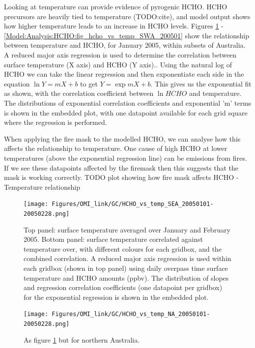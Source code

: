       Looking at temperature can provide evidence of pyrogenic HCHO.
      HCHO precursors are heavily tied to temperature (TODO:cite), and model output shows how higher temperature leads to an increase in HCHO levels.
      Figures \ref{Model:Analysis:HCHO:fig_hcho_vs_temp_SEA_200501} - \ref{Model:Analysis:HCHO:fig_hcho_vs_temp_SWA_200501} show the relationship between temperature and HCHO, for January 2005, within subsets of Australia.
      A reduced major axis regression is used to determine the correlation between surface temperature (X axis) and HCHO (Y axis)..
      Using the natural log of HCHO we can take the linear regression and then exponentiate each side in the equation $\ln{Y} = m{X}+b$ to get ${Y} = \exp{m{X}+b}$. 
      This gives us the exponential fit as shown, with the correlation coefficient between $\ln{HCHO}$ and temperature.
      The distributions of exponential correlation coefficients and exponential 'm' terms is shown in the embedded plot, with one datapoint available for each grid square where the regression is performed.
      
      When applying the fire mask to the modelled HCHO, we can analyse how this affects the relationship to temperature.
      One cause of high HCHO at lower temperatures (above the exponential regression line) can be emissions from fires.
      If we see these datapoints affected by the firemask then this suggests that the mask is working correctly.
      TODO plot showing how fire mask affects HCHO - Temperature relationship
      
      
      \begin{figure}
        \texttt{[image: Figures/OMI\_link/GC/HCHO\_vs\_temp\_SEA\_20050101-20050228.png]}
        \caption{%
          Top panel: surface temperature averaged over January and February 2005.
          Bottom panel: surface temperature correlated against temperature over, with different colours for each gridbox, and the combined correlation. 
          A reduced major axis regression is used within each gridbox (shown in top panel) using daily overpass time surface temperature and HCHO amounts (ppbv).
          The distribution of slopes and regression correlation coefficients (one datapoint per gridbox) for the exponential regression is shown in the embedded plot.
          }
        \label{Model:Analysis:HCHO:fig_hcho_vs_temp_SEA_200501}
        \end{figure}
          
        \begin{figure}
          \texttt{[image: Figures/OMI\_link/GC/HCHO\_vs\_temp\_NA\_20050101-20050228.png]}
          \caption{%
            As figure \ref{Model:Analysis:HCHO:fig_hcho_vs_temp_SEA_200501} but for northern Australia.
            }
          \label{Model:Analysis:HCHO:fig_hcho_vs_temp_NA_200501}
        \end{figure}
          

